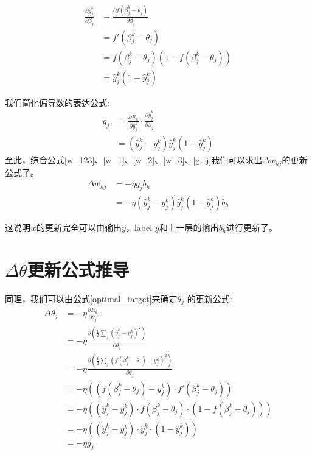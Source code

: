 \documentclass[11pt]{report}
\begin{document}
\begin{equation}
\label{w_2}
	\begin{split}
		\frac{\partial \hat{y}_j^k}{\partial \beta_j}&=\frac{\partial f(\beta_j^k-\theta_j)}{\partial \beta_j}\\
		&=f'(\beta_j^k-\theta_j)\\
		&=f(\beta_j^k-\theta_j)(1-f(\beta_j^k-\theta_j))\\
		&=\hat{y}_j^k(1-\hat{y}_j^k)
	\end{split}
\end{equation}
\par
我们简化偏导数的表达公式:
\begin{equation}
	\label{g_j}
	\begin{split}
		g_j&=\frac{\partial E_k}{\partial \hat{y}_j^k}\cdot\frac{\partial \hat{y}_j^k}{\partial \beta_j}\\
		&=(\hat{y}_j^k-y_j^k)\hat{y}_j^k(1-\hat{y}_j^k)
	\end{split}
\end{equation}
至此，综合公式\ref{w_123}、\ref{w_1}、\ref{w_2}、\ref{w_3}、\ref{g_j}我们可以求出$\Delta w_{hj}$的更新公式了。
\begin{equation}
\label{w_update}
	\begin{split}
		\Delta w_{hj}&=-\eta g_j b_h\\
		&=-\eta(\hat{y}_j^k-y_j^k)\hat{y}_j^k(1-\hat{y}_j^k)b_h
	\end{split}
\end{equation}
\par
这说明$w$的更新完全可以由输出$\hat{y}$，label $y$和上一层的输出$b_h$进行更新了。
\section{$\Delta \theta$更新公式推导}
同理，我们可以由公式\ref{optimal_target}来确定$\theta_j$	的更新公式:
\begin{equation}
	\begin{split}
		\Delta \theta_j &=-\eta\frac{\partial E_k}{\partial \theta_j}\\
		&=-\eta\frac{\partial\left(\frac{1}{2}\sum_j(\hat{y}_j^k-y_j^k)^2 \right)}{\partial \theta_j}\\
		&=-\eta\frac{\partial\left(\frac{1}{2}\sum_j(f(\beta_j^k-\theta_j)-y_j^k)^2 \right)}{\partial \theta_j}\\
		&=-\eta\left((f(\beta_j^k-\theta_j)-y_j^k)\cdot f'(\beta_j^k-\theta_j) \right)\\
		&=-\eta\left((\hat{y}_j^k-y_j^k)\cdot f(\beta_j^k-\theta_j)\cdot (1-f(\beta_j^k-\theta_j) )\right)\\
		&=-\eta\left((\hat{y}_j^k-y_j^k)\cdot \hat{y}_j^k \cdot (1-\hat{y}_j^k) \right)\\
		&=-\eta g_j
	\end{split}
\end{equation}
\end{document}
